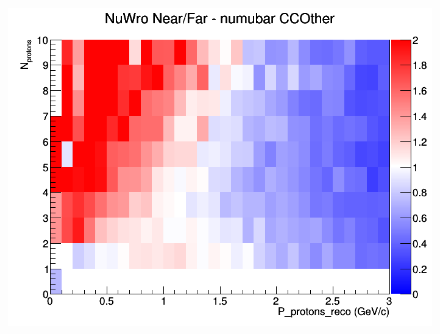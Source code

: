 \begin{figure}[h]
\endminipage
{}
\includegraphics[width=\linewidth]{eff_N_P/GAr/protons/ratios/CCOther_NuWro_numubar_NF_N_P.png}
\endminipage
\newline
\end{figure}
\clearpage

